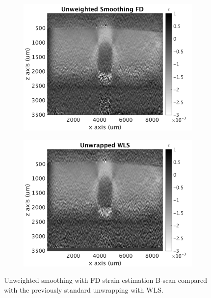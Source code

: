 \begin{figure}
	\centering
	\begin{subfigure}{0.49\textwidth}
		\centering
		\includegraphics[width=\textwidth]{figures/uwfd_compare.png}
	\end{subfigure}
	\begin{subfigure}{0.49\textwidth}
		\centering
		\includegraphics[width=\textwidth]{figures/wls_compare.png}
	\end{subfigure}
	\caption{Unweighted smoothing with FD strain estimation B-scan compared with the previously standard unwrapping with WLS.}
	\label{wls_uwfd_compare}
\end{figure}

